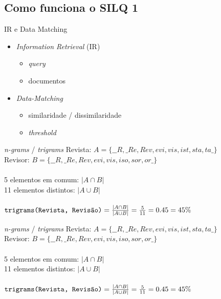 \documentclass{beamer}
\begin{document}
\subsection{Como funciona o SILQ 1}

\begin{frame}{IR e Data Matching}
  \begin{itemize}
    \item \textit{Information Retrieval} (IR)
    \begin{itemize}
      \item \textit{query}
      \item documentos
    \end{itemize}

    \item \textit{Data-Matching}
    \begin{itemize}
      \item similaridade / dissimilaridade
      \item \textit{threshold}
    \end{itemize}
  \end{itemize}
\end{frame}

\begin{frame}{\textit{n-grams} / \textit{trigrams}}
  Revista: $ A = \{\_\_R,\_Re,Rev,evi,vis,ist,sta,ta\_\}$ \\
  Revisor: $ B = \{\_\_R,\_Re,Rev,evi,vis,iso,sor,or\_\}$ \\

  \hfill \\
  5 elementos em comum: $|A \cap B|$\\
  11 elementos distintos: $|A \cup B|$\\

  \hfill \\
  $
  \texttt{trigrams(Revista, Revisão)} = {|A \cap B| \over |A \cup B|} = {5 \over 11} = 0.45 = 45\%
  $
\end{frame}

\begin{frame}{\textit{n-grams} / \textit{trigrams}}
  Revista: $ A = \{\_\_R,\_Re,Rev,evi,vis,ist,sta,ta\_\}$ \\
  Revisor: $ B = \{\_\_R,\_Re,Rev,evi,vis,iso,sor,or\_\}$ \\

  \hfill \\
  5 elementos em comum: $|A \cap B|$\\
  11 elementos distintos: $|A \cup B|$\\

  \hfill \\
  $
  \texttt{trigrams(Revista, Revisão)} = {|A \cap B| \over |A \cup B|} = {5 \over 11} = 0.45 = 45\%
  $
\end{frame}
\end{document}
